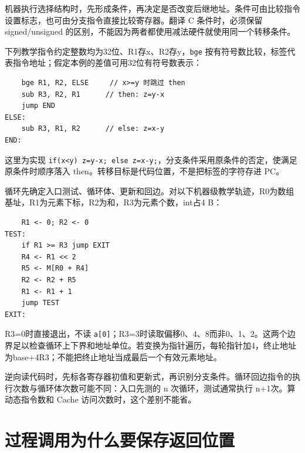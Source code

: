 机器执行选择结构时，先形成条件，再决定是否改变后继地址。条件可由比较指令设置标志，也可由分支指令直接比较寄存器。翻译 C 条件时，必须保留 signed/unsigned 的区别，不能因为两者都使用减法硬件就使用同一个转移条件。

下列教学指令约定整数均为32位、R1存x、R2存y，\allowbreak{}\texttt{bge} 按有符号数比较，标签代表指令地址；假定本例的差值可用32位有符号数表示：

\par\medskip\noindent
\begin{minipage}{\linewidth}
\begin{verbatim}
    bge R1, R2, ELSE     // x>=y 时跳过 then
    sub R3, R2, R1      // then: z=y-x
    jump END
ELSE:
    sub R3, R1, R2      // else: z=x-y
END:
\end{verbatim}
\end{minipage}\par\medskip

这里为实现 \allowbreak{}\texttt{if(x\textless{}y)\ z=y-x;}\allowbreak{}\texttt{\ else\ z=x-y;}\allowbreak{}，分支条件采用原条件的否定，使满足原条件时顺序落入 then。转移目标是代码位置，不是把标签的字符存进 PC。

循环先确定入口测试、循环体、更新和回边。对以下机器级教学轨迹，R0为数组基址，R1为元素下标，R2为和，R3为元素个数，int占4 B：

\par\medskip\noindent
\begin{minipage}{\linewidth}
\begin{verbatim}
    R1 <- 0; R2 <- 0
TEST:
    if R1 >= R3 jump EXIT
    R4 <- R1 << 2
    R5 <- M[R0 + R4]
    R2 <- R2 + R5
    R1 <- R1 + 1
    jump TEST
EXIT:
\end{verbatim}
\end{minipage}\par\medskip

R3=0时直接退出，不读 \allowbreak{}\texttt{a{[}0{]}}；R3=3时读取偏移0、4、8而非0、1、2。这两个边界足以检查循环上下界和地址单位。若变换为指针遍历，每轮指针加4，终止地址为base+4R3；不能把终止地址当成最后一个有效元素地址。

逆向读代码时，先标各寄存器初值和更新式，再识别分支条件。循环回边指令的执行次数与循环体次数可能不同：入口先测的 n 次循环，测试通常执行 n+1次。算动态指令数和 Cache 访问次数时，这个差别不能省。

\section{过程调用为什么要保存返回位置}\label{co-04-07}

